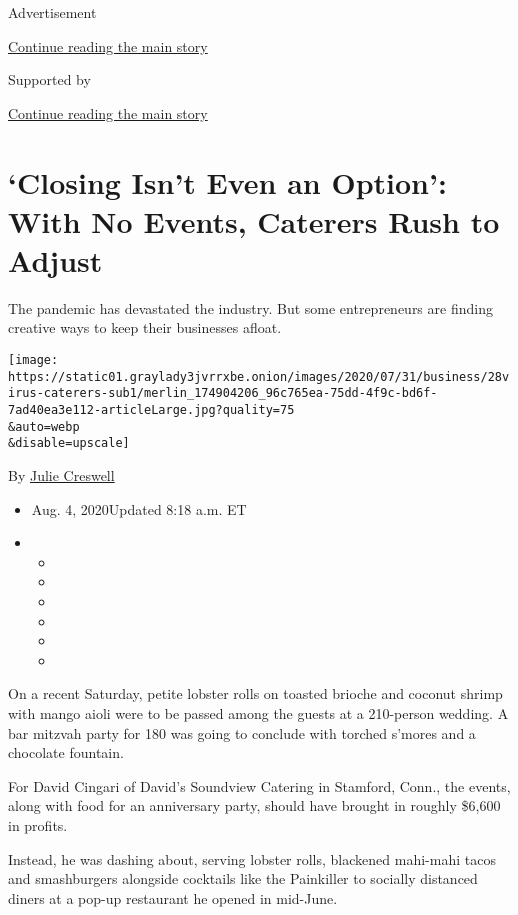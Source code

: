 Advertisement

\protect\hyperlink{after-top}{Continue reading the main story}

Supported by

\protect\hyperlink{after-sponsor}{Continue reading the main story}

\hypertarget{closing-isnt-even-an-option-with-no-events-caterers-rush-to-adjust}{%
\section{`Closing Isn't Even an Option': With No Events, Caterers Rush
to
Adjust}\label{closing-isnt-even-an-option-with-no-events-caterers-rush-to-adjust}}

The pandemic has devastated the industry. But some entrepreneurs are
finding creative ways to keep their businesses afloat.

\texttt{[image: https://static01.graylady3jvrrxbe.onion/images/2020/07/31/business/28virus-caterers-sub1/merlin\_174904206\_96c765ea-75dd-4f9c-bd6f-7ad40ea3e112-articleLarge.jpg?quality=75\\\&auto=webp\\\&disable=upscale]}

By \href{https://www.nytimes3xbfgragh.onion/by/julie-creswell}{Julie
Creswell}

\begin{itemize}
\item
  Aug. 4, 2020Updated 8:18 a.m. ET
\item
  \begin{itemize}
  \item
  \item
  \item
  \item
  \item
  \item
  \end{itemize}
\end{itemize}

On a recent Saturday, petite lobster rolls on toasted brioche and
coconut shrimp with mango aioli were to be passed among the guests at a
210-person wedding. A bar mitzvah party for 180 was going to conclude
with torched s'mores and a chocolate fountain.

For David Cingari of David's Soundview Catering in Stamford, Conn., the
events, along with food for an anniversary party, should have brought in
roughly \$6,600 in profits.

Instead, he was dashing about, serving lobster rolls, blackened
mahi-mahi tacos and smashburgers alongside cocktails like the Painkiller
to socially distanced diners at a pop-up restaurant he opened in
mid-June.

